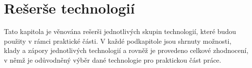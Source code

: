 \chapter{Rešerše technologií}
\label{chap:technology-research}

Tato kapitola je věnována rešerši jednotlivých skupin technologií,
které budou použity v rámci praktické části.
V každé podkapitole jsou shrnuty možnosti, klady a zápory jednotlivých
technologií a rovněž je provedeno celkové zhodnocení,
v němž je odůvodněný výběr dané technologie pro praktickou část práce.







